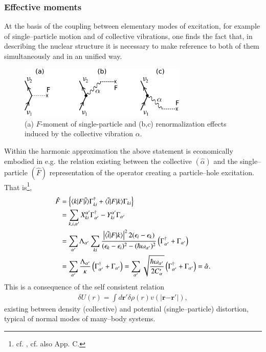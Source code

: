 \subsubsection{Effective moments}
At the basis of the coupling between elementary modes of excitation, for example of single--particle motion and of collective vibrations, one finds the fact that, in describing the nuclear structure it is necessary to make reference to both of them simultaneously and in an unified way.
   \begin{figure}
   \centerline{\includegraphics*[width=8cm,angle=0	]{nutshell/figs/fig3_A_1}}
   \caption{(a) $F$-moment of single-particle and (b,c) renormalization effects induced by the collective vibration $\alpha$.}\label{fig3.A.1}
   \end{figure}

Within the harmonic approximation the above statement is economically embodied in e.g. the relation existing between the collective $(\hat \alpha)$ and the single--particle $(\hat F)$ representation of the operator creating a particle--hole excitation. That is\footnote{cf. \cite{Bohr:75}, cf. also \cite{Brink:05} App. C.}, 
\begin{align}\label{eq1AppE1}
\nonumber \hat F&=\left\{\langle {k|F|\tilde i} \rangle\Gamma_{ki}^\dagger+\langle {\tilde i|F|k} \rangle\Gamma_{ki}\right\}\\
\nonumber &=\sum_{k,i,\alpha'}X_{ki}^{\alpha'}\Gamma_{\alpha'}^{\dagger}-Y_{ki}^{\alpha'}\Gamma_{\alpha'}\\
\nonumber &=\sum_{\alpha'}\Lambda_{\alpha'}\sum_{ki}\frac{\left|\langle {\tilde i|F|k} \rangle\right|^22(\epsilon_i-\epsilon_k)}{(\epsilon_k-\epsilon_i)^2-(\hbar\omega_{\alpha'})^2}\left(\Gamma_{\alpha'}^\dagger+\Gamma_{\alpha'}\right)\\
 &=\sum_{\alpha'}\frac{\Lambda_{\alpha'}}{\kappa}\left(\Gamma_{\alpha'}^{\dagger}+\Gamma_{\alpha'}\right)=\sum_{\alpha'}\sqrt{\frac{\hbar\omega_{\alpha'}}{2C_\alpha'}}\left(\Gamma_{\alpha'}^{\dagger}+\Gamma_{\alpha'}\right)=\hat \alpha.
\end{align}
This is a consequence of the self consistent relation
\begin{align}
\delta U(r)=\int d\mathbf r' \delta \rho(r)v(|\mathbf r{-\mathbf r'}|),
\end{align}
existing between density (collective) and potential (single--particle) distortion, typical of normal modes of many--body systems.

